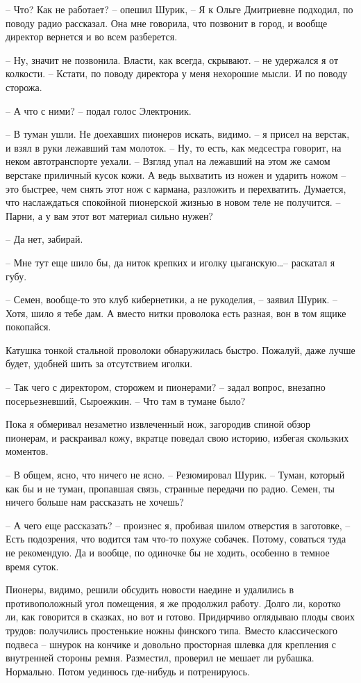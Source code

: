 \documentclass[a4paper]{book}
\begin{document}
-- Что? Как не работает? -- опешил Шурик, -- Я к Ольге Дмитриевне подходил, по поводу радио рассказал. Она мне говорила, что позвонит в город, и вообще директор вернется и во всем разберется. 

-- Ну, значит не позвонила. Власти, как всегда, скрывают. -- не удержался я от колкости. -- Кстати, по поводу директора у меня нехорошие мысли. И по поводу сторожа. 

-- А что с ними? -- подал голос Электроник.

-- В туман ушли. Не доехавших пионеров искать, видимо. -- я присел на верстак, и взял в руки лежавший там молоток. -- Ну, то есть, как медсестра говорит, на неком автотранспорте уехали. -- Взгляд упал на лежавший на этом же самом верстаке приличный кусок кожи. А ведь выхватить из ножен и ударить ножом -- это быстрее, чем снять этот нож с кармана, разложить и перехватить. Думается, что наслаждаться спокойной пионерской жизнью в новом теле не получится. -- Парни, а у вам этот вот материал сильно нужен? 

-- Да нет, забирай. 

-- Мне тут еще шило бы, да ниток крепких и иголку цыганскую\ldots -- раскатал я губу.

-- Семен, вообще-то это клуб кибернетики, а не рукоделия, -- заявил Шурик. -- Хотя, шило я тебе дам. А вместо нитки проволока есть разная, вон в том ящике покопайся.

Катушка тонкой стальной проволоки обнаружилась быстро. Пожалуй, даже лучше будет, удобней шить за отсутствием иголки. 

-- Так чего с директором, сторожем и пионерами? -- задал вопрос, внезапно посерьезневший, Сыроежкин. -- Что там в тумане было?

Пока я обмеривал незаметно извлеченный нож, загородив спиной обзор пионерам, и раскраивал кожу, вкратце поведал свою историю, избегая скользких моментов. 

-- В общем, ясно, что ничего не ясно. -- Резюмировал Шурик. -- Туман, который как бы и не туман, пропавшая связь, странные передачи по радио. Семен, ты ничего больше нам рассказать не хочешь?

-- А чего еще рассказать? -- произнес я, пробивая шилом отверстия в заготовке, -- Есть подозрения, что водится там что-то похуже собачек. Потому, соваться туда не рекомендую. Да и вообще, по одиночке бы не ходить, особенно в темное время суток. 

Пионеры, видимо, решили обсудить новости наедине и удалились в противоположный угол помещения, я же продолжил работу. Долго ли, коротко ли, как говорится в сказках, но вот и готово. Придирчиво оглядываю плоды своих трудов: получились простенькие ножны финского типа. Вместо классического подвеса --  шнурок  на кончике и довольно просторная шлевка для крепления с внутренней стороны ремня. Разместил, проверил не мешает ли рубашка. Нормально. Потом уединюсь где-нибудь и потренируюсь.
\end{document}
